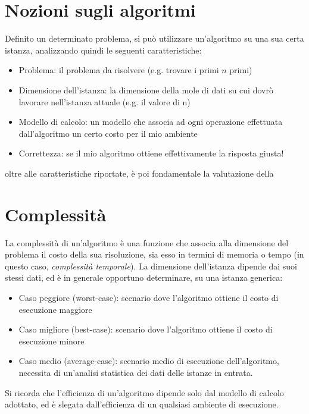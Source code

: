 \documentclass[a4paper,12pt]{article}
\begin{document}
\section{Nozioni sugli algoritmi}
Definito un determinato problema, si può utilizzare un'algoritmo su una sua certa istanza, analizzando
quindi le seguenti caratteristiche:

\begin{itemize}
  \item Problema:
    il problema da risolvere (e.g. trovare i primi $n$ primi)
  \item Dimensione dell'istanza:
    la dimensione della mole di dati su cui dovrò lavorare nell'istanza attuale (e.g. il valore di n)
  \item Modello di calcolo:
    un modello che associa ad ogni operazione effettuata dall'algoritmo un certo costo per il mio ambiente
  \item Correttezza:
    se il mio algoritmo ottiene effettivamente la risposta giusta!
\end{itemize}

oltre alle caratteristiche riportate, è poi fondamentale la valutazione della

\section{Complessità}
La complessità di un'algoritmo è una funzione che associa alla dimensione del problema il costo della sua risoluzione,
sia esso in termini di memoria o tempo (in questo caso, \textit{complessità temporale}). La dimensione dell'istanza
dipende dai suoi stessi dati, ed è in generale opportuno determinare, su una istanza generica:
\begin{itemize}
  \item Caso peggiore (worst-case):
    scenario dove l'algoritmo ottiene il costo di esecuzione maggiore
  \item Caso migliore (best-case):
    scenario dove l'algoritmo ottiene il costo di esecuzione minore
  \item Caso medio (average-case):
    scenario medio di esecuzione dell'algoritmo, necessita di un'analisi statistica dei dati delle istanze in
    entrata.
\end{itemize}

Si ricorda che l'efficienza di un'algoritmo dipende solo dal modello di calcolo adottato, ed è slegata dall'efficienza
di un qualsiasi ambiente di esecuzione.

\par\smallskip
\end{document}
